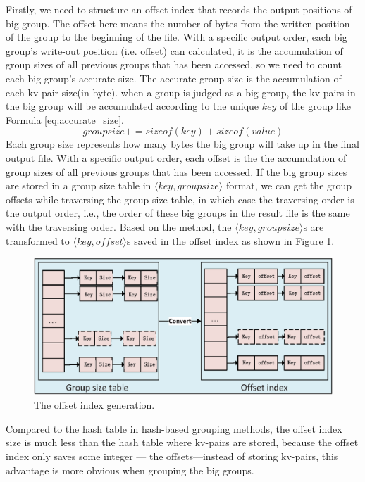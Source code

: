 Firstly, we need to structure an offset index that records the output positions of big group. The offset here means the number of bytes from the written position of the group to the beginning of the file. With a specific output order, each big group's write-out position (i.e. offset) can calculated, it is the accumulation of group sizes of all previous groups that has been accessed, so we need to count each big group's accurate size. The accurate group size is the accumulation of each kv-pair size(in byte). when a group is judged as a big group, the kv-pairs in the big group will be accumulated according to the unique $key$ of the group like Formula \ref{eq:accurate_size}.
\begin{equation}\label{eq:accurate_size}
    groupsize += sizeof(key) + sizeof(value)
\end{equation}
Each group size represents how many bytes the big group will take up in the final output file. With a specific output order, each offset is the
the accumulation of group sizes of all previous groups that has been accessed. If the big group sizes are stored in a group size table in $\langle key, groupsize\rangle$ format, we can get the group offsets while traversing the group size table, in which case the traversing order is the output order, i.e., the order of these big groups in the result file is the same with the traversing order. Based on the method, the $\langle key, groupsize\rangle$s are transformed to $\langle key, offset\rangle$s saved in the offset index as shown in Figure \ref{fig:convert}.

\begin{figure}
\includegraphics[width=.5\textwidth]{fig/convert}
\caption{The offset index generation.}
\label{fig:convert}
\end{figure}

Compared to the hash table in hash-based grouping methods, the offset index size is much less than the hash table where kv-pairs are stored, because the offset index only saves some integer --- the offsets---instead of storing kv-pairs, this advantage is more obvious when grouping the big groups. 

